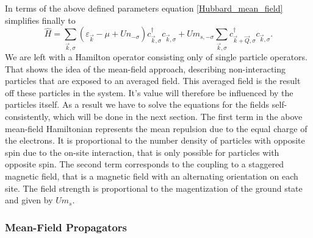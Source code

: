 \documentclass[a4paper,10pt]{report}
\begin{document}
In terms of the above defined parameters equation \ref{Hubbard_mean_field} simplifies finally to
\begin{equation}
 \hat H = \sum_{\vec k, \sigma} \left( \varepsilon_{\vec k } - \mu + U n_{-\sigma} \right) c^{\dagger}_{\vec k, \sigma} c_{\vec k ,\sigma}
	  + U m_{s,-\sigma} \sum_{\vec k, \sigma} c^{\dagger}_{\vec k + \vec Q, \sigma} c_{\vec k, \sigma}.
\end{equation}
%
%
%
We are left with a Hamilton operator consisting only of single particle operators. 
That shows the idea of the mean-field approach, describing non-interacting particles that are exposed to an averaged field.
This averaged field is the result off these particles in the system. It's value will therefore be influenced by the particles itself.
As a result we have to solve the equations for the fields self-consistently, which will be done in the next section. 
The first term in the above mean-field Hamiltonian represents the mean repulsion due to the equal charge of the electrons.
It is proportional to the number density of particles with opposite spin due to the on-site interaction, that is only possible for particles with opposite spin.
The second term corresponds to the coupling to a staggered magnetic field, that is a magnetic field with an alternating orientation on each site. 
The field strength is proportional to the magentization of the ground state and given by $Um_s$.

\subsubsection{Mean-Field Propagators}
\end{document}
